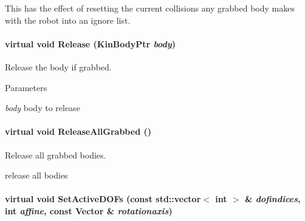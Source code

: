 This has the effect of resetting the current collisions any grabbed body makes with the robot into an ignore list. \hypertarget{classOpenRAVE_1_1RobotBase_ada9b12e106deb259af6c3f9f2d8589c1}{
\paragraph[{Release}]{\setlength{\rightskip}{0pt plus 5cm}virtual void Release (KinBodyPtr {\em body})}\hfill}
\label{classOpenRAVE_1_1RobotBase_ada9b12e106deb259af6c3f9f2d8589c1}


Release the body if grabbed. 


\begin{DoxyParams}{Parameters}
\item[{\em body}]body to release \end{DoxyParams}
\hypertarget{classOpenRAVE_1_1RobotBase_a786014c730e245029cf6d944eb65ee2d}{
\paragraph[{ReleaseAllGrabbed}]{\setlength{\rightskip}{0pt plus 5cm}virtual void ReleaseAllGrabbed ()}\hfill}
\label{classOpenRAVE_1_1RobotBase_a786014c730e245029cf6d944eb65ee2d}


Release all grabbed bodies. 

release all bodies \hypertarget{classOpenRAVE_1_1RobotBase_a1320f8a27bf8e2431f2d876ab74b5375}{
\paragraph[{SetActiveDOFs}]{\setlength{\rightskip}{0pt plus 5cm}virtual void SetActiveDOFs (const std::vector$<$ int $>$ \& {\em dofindices}, \/  int {\em affine}, \/  const Vector \& {\em rotationaxis})}\hfill}
\label{classOpenRAVE_1_1RobotBase_a1320f8a27bf8e2431f2d876ab74b5375}


